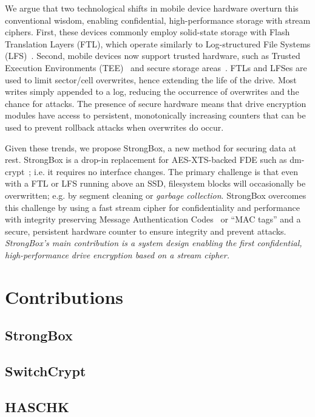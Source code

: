 We argue that two technological shifts in mobile device hardware overturn this
conventional wisdom, enabling confidential, high-performance storage with stream
ciphers. First, these devices commonly employ solid-state storage with Flash
Translation Layers (FTL), which operate similarly to Log-structured File Systems
(LFS)~\cite{LFS,F2FS,NILFS}. Second, mobile devices now support trusted
hardware, such as Trusted Execution Environments (TEE)~\cite{TEE,TrustZone} and
secure storage areas~\cite{eMMC-standard}. FTLs and LFSes are used to limit
sector/cell overwrites, hence extending the life of the drive. Most writes
simply appended to a log, reducing the occurrence of overwrites and the chance
for attacks. The presence of secure hardware means that drive encryption modules
have access to persistent, monotonically increasing counters that can be used to
prevent rollback attacks when overwrites do occur.

Given these trends, we propose StrongBox, a new method for securing data at
rest. StrongBox is a drop-in replacement for AES-XTS-backed FDE such as
dm-crypt~\cite{dmcrypt}; i.e. it requires no interface changes. The primary
challenge is that even with a FTL or LFS running above an SSD, filesystem blocks
will occasionally be overwritten; e.g. by segment cleaning or \emph{garbage
collection}. StrongBox overcomes this challenge by using a fast stream cipher
for confidentiality and performance with integrity preserving Message
Authentication Codes~\cite{MAC} or ``MAC tags'' and a secure, persistent
hardware counter to ensure integrity and prevent attacks. \emph{StrongBox's main
contribution is a system design enabling the first confidential,
high-performance drive encryption based on a stream cipher.}


\section{Contributions}

\subsection{StrongBox}


\subsection{SwitchCrypt}


\subsection{HASCHK}

